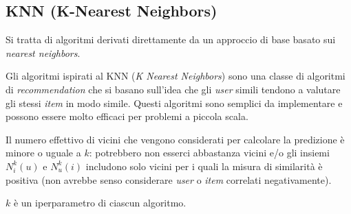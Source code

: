 \subsection{KNN (K-Nearest Neighbors)}\label{knn}
Si tratta di algoritmi derivati direttamente da un approccio di base basato sui \textit{nearest neighbors}.

Gli algoritmi ispirati al KNN (\textit{K Nearest Neighbors}) sono una classe di algoritmi di \textit{recommendation} che si basano sull'idea che gli \textit{user} simili tendono a valutare gli stessi \textit{item} in modo simile. Questi algoritmi sono semplici da implementare e possono essere molto efficaci per problemi a piccola scala.

Il numero effettivo di vicini che vengono considerati per calcolare la predizione è minore o uguale a $k$: potrebbero non esserci abbastanza vicini e/o gli insiemi $N_i^k(u)$ e $N_u^k(i)$ includono solo vicini per i quali la misura di similarità è positiva (non avrebbe senso considerare \textit{user} o \textit{item} correlati negativamente).

$k$ è un iperparametro di ciascun algoritmo.

